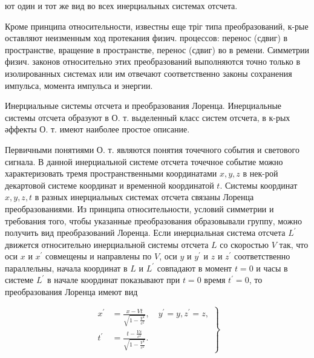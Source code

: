 \documentclass[10pt]{article}
\begin{document}
ют один и тот же вид во всех инерциальных системах отсчета.



Кроме принципа относительности, известны еще тріг типа преобразований, к-рые оставляют неизменным ход протекания физич. процессов: перенос (сдвиг) в пространстве, вращение в пространстве, перенос (сдвиг) во в ремени. Симметрии физич. законов относительно этих преобразований выполняются точно только в изолированных системах или им отвечают соответственно законы сохранения импульса, момента импульса и энергии.



Инерциальные системы отсчета и преобразования Лоренца. Инерциальные системы отсчета образуют в О. т. выделенный класс систем отсчета, в к-рых әффекты О. т. имеют наиболее простое описание.



Первичными понятиями О. т. являются понятия точечного события и светового сигнала. В данной инерциальной системе отсчета точечное событие можно характеризовать тремя пространственными координатами $x, y, z$ в нек-рой декартовой системе координат и временной координатой $t$. Системы координат $x, y, z, t$ в разных инерциальных системах отсчета связаны Лоренца преобразованиями. Из принципа относительности, условий симметрии и требования того, чтобы указанные преобразования образовывали группу, можно получить вид преобразований Лоренца. Если инерциальная система отсчета $L^{\prime}$ движется относительно инерциальной системы отсчета $L$ со скоростью $V$ так, что оси $x$ и $x^{\prime}$ совмещены и направлены по $V$, оси $y$ и $y^{\prime}$ и $z$ и $z^{\prime}$ соответственно параллельны, начала координат в $L$ и $L^{\prime}$ совпадают в момент $t=0$ и часы в системе $L^{\prime}$ в начале координат показывают при $t=0$ время $t^{\prime}=0$, то преобразования Лоренца имеют вид



\[

\left.\begin{array}{rl}

x^{\prime} & =\frac{x-V t}{\sqrt{1-\frac{V^{2}}{c^{2}}}}, \quad y^{\prime}=y, z^{\prime}=z, \\

t^{\prime} & =\frac{t-\frac{V x}{c^{2}}}{\sqrt{1-\frac{V^{2}}{c^{2}}}} .

\end{array}\right\}

\]
\end{document}
